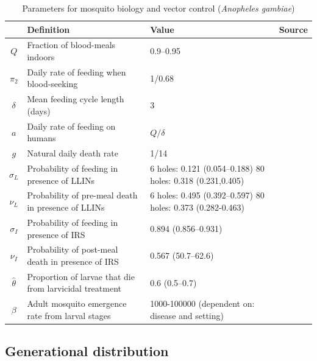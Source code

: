 \begin{table}[t]
\caption{Parameters for mosquito biology and vector control (\textit{Anopheles gambiae})}%
\vspace{.1cm}
\centering %
\begin{tabular}{|c|p{54mm}|p{48mm}|c|}%
\hline                        %
 & Definition & Value & Source \\ [0.5ex]%
\hline                  %
$Q$ & Fraction of blood-meals indoors & 0.9--0.95 & \cite{Killeen2000} \\
$\pi_2$ & Daily rate of feeding when blood-seeking & 1/0.68 & \cite{Killeen2000} \\
$\delta$ & Mean feeding cycle length (days) & 3 & \cite{Killeen2000} \\
$a$ & Daily rate of feeding on humans & $Q/\delta$ & \cite{Smith2012}  \\
$g$ & Natural daily death rate & 1/14 & \cite{CDCMalaria,le2007} \\
$\sigma_L$ & Probability of feeding in presence of LLINs & 6 holes: 0.121 (0.054--0.188) 80 holes: 0.318 (0.231,0.405) & \cite{Ngufor2011} \\
$\nu_L$ & Probability of pre-meal death in presence of LLINs & 6 holes: 0.495 (0.392--0.597) 80 holes: 0.373 (0.282-0.463) & \cite{Ngufor2011} \\
$\sigma_I$ & Probability of feeding in presence of IRS & 0.894 (0.856--0.931) & \cite{Ngufor2011} \\
$\nu_I$ & Probability of post-meal death in presence of IRS & 0.567 (50.7--62.6) & \cite{Ngufor2011}\\
$\hat{\theta}$ & Proportion of larvae that die from larvicidal treatment & 0.6 (0.5--0.7) & \cite{Kroeger1995}\\
$\beta$ & Adult mosquito emergence rate from larval stages & 1000-100000 (dependent on: disease and setting) & \\
[1ex]      %
\hline%
\end{tabular}
\label{table:param_vector}%
\end{table}

\subsection{Generational distribution}

